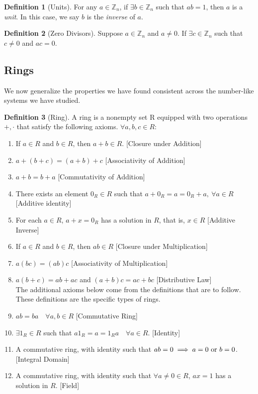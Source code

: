 \documentclass{article}
\theoremstyle{definition}
\newtheorem{definition}{Definition}[section]
\theoremstyle{remark}
\begin{document}
\begin{definition}[Units]\label{def:units}
For any $ a \in \mathbb{Z}_n$, if $ \exists b \in \mathbb{Z}_n$ such that $ab = 1$, then $a$ is a \textit{unit}. In this case, we say $b$ is the \textit{inverse} of $a$.
\end{definition}

\begin{definition}[Zero Divisors]\label{def:zero_divisor}
Suppose $a \in \mathbb{Z}_n$ and $ a \neq 0$. If  $ \exists c \in \mathbb{Z}_n$ such that $c \neq 0$ and $ac = 0$.
\end{definition}








\subsection{Rings}
\par We now generalize the properties we have found consistent across the number-like systems we have studied. 


\begin{definition}[Ring]\label{def:ring}
A ring is a nonempty set R equipped with two operations \(+, \cdot\) that satisfy the following axioms. \(\forall a,b,c \in R\):
\begin{enumerate}
\item If \(a \in R\) and \(b \in R\), then \(a + b \in R\). \hfill [Closure under Addition]
\item \(a + (b+c) = (a+b)+c\) \hfill [Associativity of Addition]
\item \(a + b = b + a\) \hfill [Commutativity of Addition]
\item There exists an element \( 0_R \in R\) such that \(a + 0_R = a = 0_R + a, \ \forall a \in R\) \hfill [Additive identity]
\item For each \(a \in R\), \(a + x = 0_R\) has a solution in \(R\), that is, \(x \in R\) \hfill [Additive Inverse]
\item If \(a \in R\) and \(b \in R\), then \(ab \in R\) \hfill [Closure under Multiplication]
\item \(a(bc) = (ab)c\) \hfill [Associativity of Multiplication]
\item \( a(b+c) = ab + ac\) and \((a+b)c = ac + bc\) \hfill [Distributive Law] \\
The additional axioms below come from the definitions that are to follow. These definitions are the specific types of rings.
\item $ab = ba \quad \forall a,b \in R$ \hfill [Commutative Ring] 
\item $\exists 1_R \in R$ such that $a1_R = a = 1_Ra \quad \forall a \in R $. \hfill [Identity] 
\item A commutative ring, with identity such that $ab=0 \implies a= 0 \textnormal{ or } b=0$. \hfill [Integral Domain] 
\item A commutative ring, with identity such that $\forall a \neq 0 \in R$, $ax = 1$ has a solution in $R$. \hfill [Field] 
\end{enumerate}

\end{definition}
\end{document}
